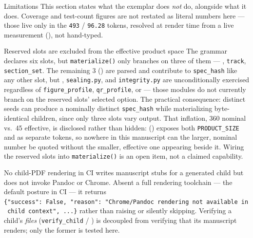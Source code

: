 \documentclass[
  ignorenonframetext,
]{beamer}
\author{\texorpdfstring{}{}}
\date{}
\begin{document}
\begin{frame}{Limitations}
\protect{}\label{limitations}
This section states what the exemplar does \emph{not} do, alongside what
it does. Coverage and test-count figures are not restated as literal
numbers here --- those live only in the \texttt{493} / \texttt{96.28}
tokens, resolved at render time from a live measurement
(), not
hand-typed.

\begin{block}{Reserved slots are excluded from the effective product
space}
\protect{}\label{reserved-slots-are-excluded-from-the-effective-product-space}
The grammar declares six slots, but \texttt{materialize()} only branches
on three of them --- , \texttt{track},
\texttt{section\_set}. The remaining 3
() are parsed
and contribute to \texttt{spec\_hash} like any other slot, but
, \texttt{sealing.py}, and
\texttt{integrity.py} are unconditionally exercised regardless of
\texttt{figure\_profile}, \texttt{qr\_profile}, or
 --- those modules do not currently branch on
the reserved slots' selected option. The practical consequence: distinct
seeds can produce a nominally distinct \texttt{spec\_hash} while
materializing byte-identical children, since only three slots vary
output. That inflation, 360 nominal vs.~45 effective, is disclosed
rather than hidden: 
() exposes both
\texttt{PRODUCT\_SIZE} and  as separate
tokens, so nowhere in this manuscript can the larger, nominal number be
quoted without the smaller, effective one appearing beside it. Wiring
the reserved slots into \texttt{materialize()} is an open item, not a
claimed capability.
\end{block}

\begin{block}{No child-PDF rendering in CI}
\protect{}\label{no-child-pdf-rendering-in-ci}
 writes manuscript stubs
for a generated child but does not invoke Pandoc or Chrome. Absent a
full rendering toolchain --- the default posture in CI --- it returns
\texttt{\{"success":\ False,\ "reason":\ "Chrome/Pandoc\ rendering\ not\ available\ in\ child\ context",\ ...\}}
rather than raising or silently skipping. Verifying a child's
\emph{files} (\texttt{verify\_child} / ) is
decoupled from verifying that its manuscript renders; only the former is
tested here.
\end{block}


\end{frame}
\end{document}
